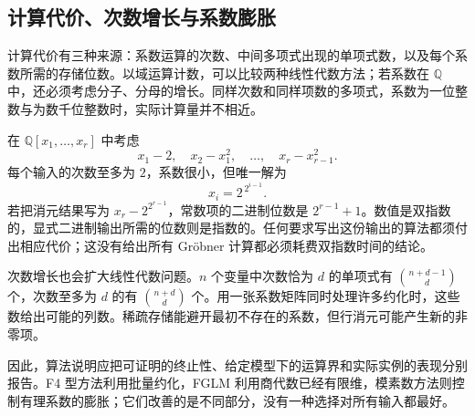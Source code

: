 \subsection{计算代价、次数增长与系数膨胀}
\label{b3:subsec:B01:04}

计算代价有三种来源：系数运算的次数、中间多项式出现的单项式数，以及每个系数所需的存储位数。以域运算计数，可以比较两种线性代数方法；若系数在 \(\mathbb Q\) 中，还必须考虑分子、分母的增长。同样次数和同样项数的多项式，系数为一位整数与为数千位整数时，实际计算量并不相近。

\begin{example}\label{b3:exm:B-bit-growth}
	在 \(\mathbb Q[x_1,\ldots,x_r]\) 中考虑
	\[
		x_1-2,\quad x_2-x_1^2,\quad\ldots,\quad x_r-x_{r-1}^2.
	\]
	每个输入的次数至多为 \(2\)，系数很小，但唯一解为
	\[
		x_i=2^{\,2^{i-1}}.
	\]
	若把消元结果写为 \(x_r-2^{2^{r-1}}\)，常数项的二进制位数是 \(2^{r-1}+1\)。数值是双指数的，显式二进制输出所需的位数则是指数的。任何要求写出这份输出的算法都须付出相应代价；这没有给出所有 Gröbner 计算都必须耗费双指数时间的结论。
\end{example}

次数增长也会扩大线性代数问题。\(n\) 个变量中次数恰为 \(d\) 的单项式有 \(\binom{n+d-1}{d}\) 个，次数至多为 \(d\) 的有 \(\binom{n+d}{d}\) 个。用一张系数矩阵同时处理许多约化时，这些数给出可能的列数。稀疏存储能避开最初不存在的系数，但行消元可能产生新的非零项。

\ProseParagraphBreak
因此，算法说明应把可证明的终止性、给定模型下的运算界和实际实例的表现分别报告。F4 型方法利用批量约化，FGLM 利用商代数已经有限维，模素数方法则控制有理系数的膨胀；它们改善的是不同部分，没有一种选择对所有输入都最好。
